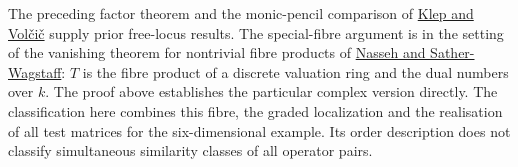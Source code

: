 \documentclass[11pt]{article}
\begin{document}
The preceding factor theorem and the monic-pencil comparison of
\href{https://arxiv.org/abs/1512.02648}{Klep and Vol\v ci\v c}
supply prior free-locus results. The special-fibre argument is in the
setting of the vanishing theorem for nontrivial fibre products of
\href{https://doi.org/10.1090/proc/13633}{Nasseh and Sather-Wagstaff}:
$T$ is the fibre product of a discrete valuation ring and the dual
numbers over $k$. The proof above establishes the particular complex
version directly. The classification here combines this fibre, the
graded localization and the realisation of all test matrices for the
six-dimensional example. Its order description does not classify
simultaneous similarity classes of all operator pairs.
\end{document}
